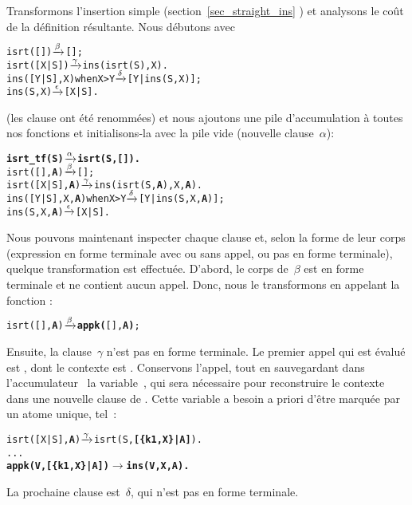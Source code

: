 Transformons l'insertion simple (section~\ref{sec_straight_ins}
) et analysons le coût de la définition
résultante. Nous débutons avec
\begin{alltt}
isrt(   [])             \(\smashedrightarrow{\beta}\) [];
isrt([X|S])             \(\smashedrightarrow{\gamma}\) ins(isrt(S),X).
ins([Y|S],X) when X > Y \(\smashedrightarrow{\delta}\) [Y|ins(S,X)];
ins(    S,X)            \(\smashedrightarrow{\epsilon}\) [X|S].
\end{alltt}
(les clause ont été renommées) et nous ajoutons une pile
d'accumulation à toutes nos fonctions et initialisons-la avec la pile
vide (nouvelle clause~\(\alpha\)):
\begin{alltt}
\textbf{isrt_tf(S)                \(\smashedrightarrow{\alpha}\) isrt(S,[]).}
isrt(   [],\textbf{A})             \(\smashedrightarrow{\beta}\) [];\hfill% A \emph{inutile pour le moment}
isrt([X|S],\textbf{A})             \(\smashedrightarrow{\gamma}\) ins(isrt(S,\textbf{A}),X,\textbf{A}).
ins([Y|S],X,\textbf{A}) when X > Y \(\smashedrightarrow{\delta}\) [Y|ins(S,X,\textbf{A})];
ins(    S,X,\textbf{A})            \(\smashedrightarrow{\epsilon}\) [X|S].\hfill% A \emph{inutile}
\end{alltt}
Nous pouvons maintenant inspecter chaque clause et, selon la forme de
leur corps (expression en forme terminale avec ou sans appel, ou pas
en forme terminale), quelque transformation est effectuée. D'abord, le
corps de~\(\beta\) est en forme terminale et ne contient aucun
appel. Donc, nous le transformons en appelant la fonction
:
\begin{alltt}
isrt(   [],\textbf{A})             \(\smashedrightarrow{\beta}\) \textbf{appk(}[],\textbf{A)};
\end{alltt}
Ensuite, la clause~\(\gamma\) n'est pas en forme terminale. Le premier
appel qui est évalué est , dont le contexte est
. Conservons l'appel, tout en
sauvegardant dans l'accumulateur~ la variable~,
qui sera nécessaire pour reconstruire le contexte dans une nouvelle
clause de . Cette variable a besoin a priori d'être
marquée par un atome unique, tel~:
\begin{alltt}
isrt([X|S],\textbf{A})             \(\smashedrightarrow{\gamma}\) isrt(S,\textbf{[\{k1,X\}|A]}).
...
\textbf{appk(V,[\{k1,X\}|A])        \(\rightarrow\) ins(V,X,A).}
\end{alltt}
La prochaine clause est~\(\delta\), qui n'est pas en forme terminale.
